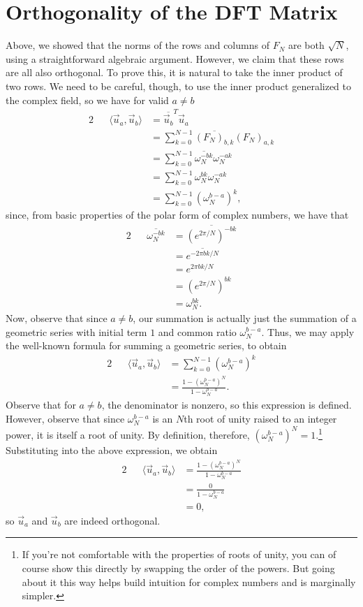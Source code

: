 \documentclass[letterpaper]{article}
\theoremstyle{remark}
\newcommand{\eqn}[1]{\begin{alignat*}{2}#1\end{alignat*}}
\begin{document}
\section{Orthogonality of the DFT Matrix}
Above, we showed that the norms of the rows and columns of $F_N$ are both $\sqrt{N}$, using a straightforward algebraic argument. However, we claim that these rows are all also orthogonal. To prove this, it is natural to take the inner product of two rows. We need to be careful, though, to use the inner product generalized to the complex field, so we have for valid $a \ne b$
\eqn{
    && \langle \vec{u}_a, \vec{u}_b \rangle &= \overline{\vec{u}_b}^T \vec{u}_a \\
    &&&= \sum_{k=0}^{N-1} \overline{(F_N)_{b, k}} (F_N)_{a, k} \\
    &&&= \sum_{k=0}^{N-1} \overline{\omega_N^{-bk}}\omega_N^{-ak} \\
    &&&= \sum_{k=0}^{N-1} \omega_N^{bk}\omega_N^{-ak} \\
    &&&= \sum_{k=0}^{N-1} (\omega_N^{b-a})^k,
}
since, from basic properties of the polar form of complex numbers, we have that
\eqn{
    && \overline{\omega_N^{-bk}} &= \overline{(e^{2\pi / N})^{-bk}} \\
    &&&= \overline{e^{-2\pi b k / N}} \\
    &&&= e^{2 \pi b k / N} \\
    &&&= (e^{2 \pi / N})^{bk} \\
    &&&= \omega_N^{bk}.
}
Now, observe that since $a \ne b$, our summation is actually just the summation of a geometric series with initial term $1$ and common ratio $\omega_N^{b-a}$. Thus, we may apply the well-known formula for summing a geometric series, to obtain
\eqn{
    && \langle \vec{u}_a, \vec{u}_b \rangle &= \sum_{k=0}^{N-1} (\omega_N^{b-a})^k \\
    &&&= \frac{1 - (\omega_N^{b-a})^N}{1 - \omega_N^{b-a}}.
}
Observe that for $a \ne b$, the denominator is nonzero, so this expression is defined. However, observe that since $\omega_N^{b-a}$ is an $N$th root of unity raised to an integer power, it is itself a root of unity. By definition, therefore, $(\omega_N^{b-a})^N = 1$.\footnote{If you're not comfortable with the properties of roots of unity, you can of course show this directly by swapping the order of the powers. But going about it this way helps build intuition for complex numbers and is marginally simpler.} Substituting into the above expression, we obtain
\eqn{
    && \langle \vec{u}_a, \vec{u}_b \rangle &= \frac{1 - (\omega_N^{b-a})^N}{1 - \omega_N^{b-a}} \\
    &&&= \frac{0}{1 - \omega_N^{b-a}} \\
    &&&= 0,
}
so $\vec{u}_a$ and $\vec{u}_b$ are indeed orthogonal.
\end{document}
